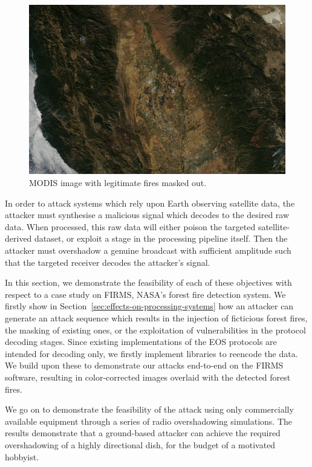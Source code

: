 \begin{figure}
    \includegraphics[width=\columnwidth]{diagrams/injection/masked_0.jpg}
    \caption{MODIS image with legitimate fires masked out.}
    \label{fig:injection-masked}
\end{figure}

In order to attack systems which rely upon Earth observing satellite data, the attacker must synthesise a malicious signal which decodes to the desired raw data.
When processed, this raw data will either poison the targeted satellite-derived dataset, or exploit a stage in the processing pipeline itself.
Then the attacker must overshadow a genuine broadcast with sufficient amplitude such that the targeted receiver decodes the attacker's signal.

In this section, we demonstrate the feasibility of each of these objectives with respect to a case study on FIRMS, NASA's forest fire detection system.
We firstly show in Section~\ref{sec:effects-on-processing-systems} how an attacker can generate an attack sequence which results in the injection of ficticious forest fires, the masking of existing ones, or the exploitation of vulnerabilities in the protocol decoding stages.
Since existing implementations of the EOS protocols are intended for decoding only, we firstly implement libraries to reencode the data.
We build upon these to demonstrate our attacks end-to-end on the FIRMS software, resulting in color-corrected images overlaid with the detected forest fires.

We go on to demonstrate the feasibility of the attack using only commercially available equipment through a series of radio overshadowing simulations.
The results demonstrate that a ground-based attacker can achieve the required overshadowing of a highly directional dish, for the budget of a motivated hobbyist.

